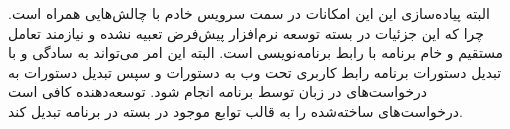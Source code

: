البته پیاده‌سازی این این امکانات در سمت سرویس خادم با چالش‌هایی همراه است. چرا که این جزئیات در بسته توسعه نرم‌افزار پیش‌فرض تعبیه نشده و نیازمند تعامل مستقیم و خام برنامه با رابط برنامه‌نویسی  است. البته این امر می‌تواند به سادگی و با تبدیل دستورات برنامه رابط کاربری تحت وب به دستورات  و سپس تبدیل دستورات  به درخواست‌های  در زبان  توسط برنامه  انجام شود. توسعه‌دهنده کافی است درخواست‌های ساخته‌شده را به قالب توابع موجود  در بسته  در برنامه تبدیل کند.